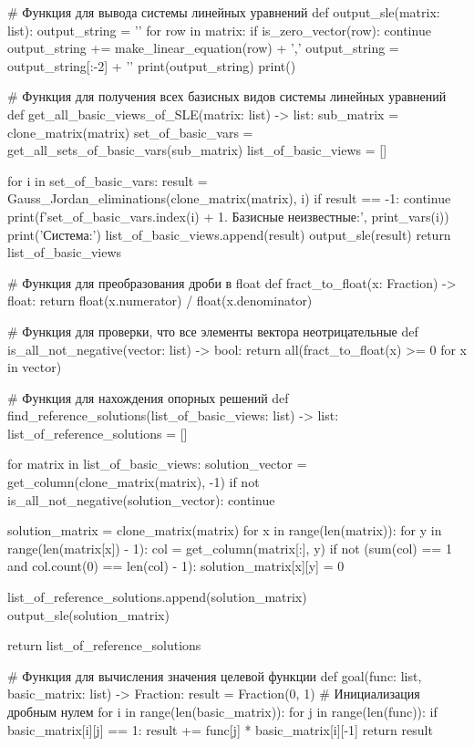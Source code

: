 \documentclass{report}
\begin{document}
\begin{code}
# Функция для вывода системы линейных уравнений
def output_sle(matrix: list):
   output_string = '{'
   for row in matrix:
	   if is_zero_vector(row):
		   continue
	   output_string += make_linear_equation(row) + ',\n'
   output_string = output_string[:-2] + '}'
   print(output_string)
   print()
		
# Функция для получения всех базисных видов системы линейных уравнений
def get_all_basic_views_of_SLE(matrix: list) -> list:
   sub_matrix = clone_matrix(matrix)
   set_of_basic_vars = get_all_sets_of_basic_vars(sub_matrix)
   list_of_basic_views = []

   for i in set_of_basic_vars:
	   result = Gauss_Jordan_eliminations(clone_matrix(matrix), i)
	   if result == -1:
		   continue
	   print(f'{set_of_basic_vars.index(i) + 1}. Базисные неизвестные:', print_vars(i))
	   print('Система:')
	   list_of_basic_views.append(result)
	   output_sle(result)
   return list_of_basic_views

# Функция для преобразования дроби в float
def fract_to_float(x: Fraction) -> float:
   return float(x.numerator) / float(x.denominator)
		
# Функция для проверки, что все элементы вектора неотрицательные
def is_all_not_negative(vector: list) -> bool:
   return all(fract_to_float(x) >= 0 for x in vector)

# Функция для нахождения опорных решений
def find_reference_solutions(list_of_basic_views: list) -> list:
   list_of_reference_solutions = []

   for matrix in list_of_basic_views:
	   solution_vector = get_column(clone_matrix(matrix), -1)
	   if not is_all_not_negative(solution_vector):
		   continue

	   solution_matrix = clone_matrix(matrix)
	   for x in range(len(matrix)):
		   for y in range(len(matrix[x]) - 1):
			   col = get_column(matrix[:], y)
			   if not (sum(col) == 1 and col.count(0) == len(col) - 1):
				   solution_matrix[x][y] = 0

	   list_of_reference_solutions.append(solution_matrix)
	   output_sle(solution_matrix)

   return list_of_reference_solutions

# Функция для вычисления значения целевой функции
def goal(func: list, basic_matrix: list) -> Fraction:
   result = Fraction(0, 1)  # Инициализация дробным нулем
   for i in range(len(basic_matrix)):
	   for j in range(len(func)):
		   if basic_matrix[i][j] == 1:
			   result += func[j] * basic_matrix[i][-1]
   return result


\end{code}
\end{document}
